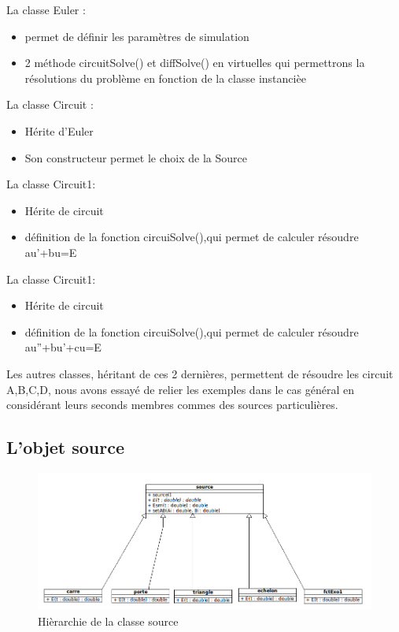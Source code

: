 \documentclass[a4paper,11pt]{article}
\begin{document}
\noindent La classe Euler :
\begin{itemize}
 \item permet de définir les paramètres de simulation
  \item 2 méthode circuitSolve() et diffSolve() en virtuelles qui permettrons la résolutions du problème en fonction de la classe instancièe
\end{itemize}
La classe Circuit :
\begin{itemize}
 \item Hérite d'Euler
  \item Son constructeur permet le choix de la Source 
\end{itemize}
La classe Circuit1:
\begin{itemize}
 \item Hérite de circuit
  \item définition de la fonction circuiSolve(),qui permet de calculer résoudre au'+bu=E  
\end{itemize}
La classe Circuit1:
\begin{itemize}
 \item Hérite de circuit
  \item définition de la fonction circuiSolve(),qui permet de calculer résoudre au''+bu'+cu=E  \\
\end{itemize}

\noindent Les autres classes, héritant de ces 2 dernières, permettent de résoudre les circuit A,B,C,D, nous avons essayé de relier les exemples 
dans le cas général en considérant leurs seconds membres commes des sources particulières. \\

  \subsection{L'objet source}
    \begin{figure}[H]
	 \begin{center}
	\includegraphics[scale=.5]{sourceDiagram}
	\caption{Hièrarchie de la classe source}
	\end{center}
      \end{figure}
\end{document}

